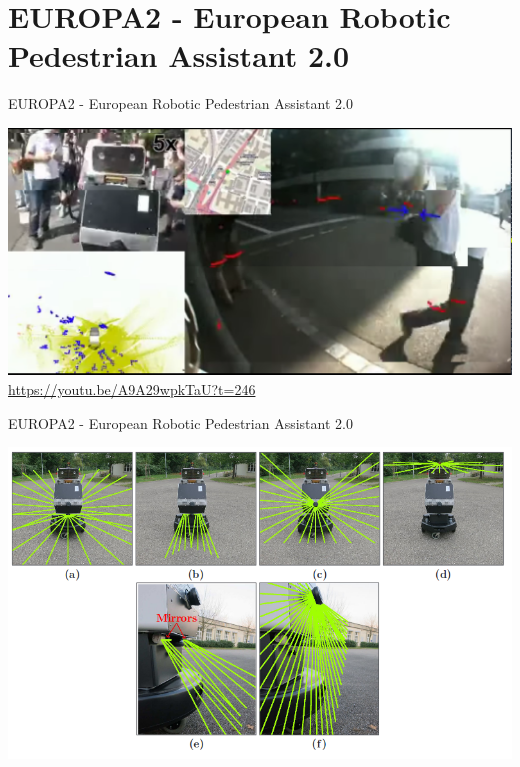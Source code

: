 \documentclass[aspectratio=169]{beamer}
\begin{document}
  \section{EUROPA2 - European Robotic Pedestrian Assistant 2.0}
  \begin{frame}{EUROPA2 - European Robotic Pedestrian Assistant 2.0}
  	\begin{center}
  		\includegraphics[scale=0.15]{img/europa.png} \\
  		\url{https://youtu.be/A9A29wpkTaU?t=246}
  	\end{center}
  \end{frame}
  
  \begin{frame}{EUROPA2 - European Robotic Pedestrian Assistant 2.0}
  	\begin{center}
  		\includegraphics[scale=0.38]{img/europa2_lasers.png}
  	\end{center}
  \end{frame}
  
\end{document}
